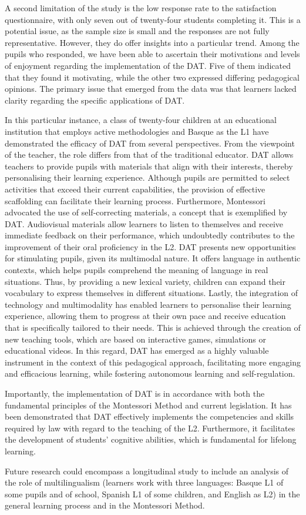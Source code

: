 A second limitation of the study is the low response rate to the satisfaction questionnaire, with only seven out of twenty-four students completing it. This is a potential issue, as the sample size is small and the responses are not fully representative. However, they do offer insights into a particular trend. Among the pupils who responded, we have been able to ascertain their motivations and levels of enjoyment regarding the implementation of the DAT. Five of them indicated that they found it motivating, while the other two expressed differing pedagogical opinions. The primary issue that emerged from the data was that learners lacked clarity regarding the specific applications of DAT.

In this particular instance, a class of twenty-four children at an educational institution that employs active methodologies and Basque as the L1 have demonstrated the efficacy of DAT from several perspectives. From the viewpoint of the teacher, the role differs from that of the traditional educator. DAT allows teachers to provide pupils with materials that align with their interests, thereby personalising their learning experience. Although pupils are permitted to select activities that exceed their current capabilities, the provision of effective scaffolding can facilitate their learning process. Furthermore, Montessori advocated the use of self-correcting materials, a concept that is exemplified by DAT. Audiovisual materials allow learners to listen to themselves and receive immediate feedback on their performance, which undoubtedly contributes to the improvement of their oral proficiency in the L2. DAT presents new opportunities for stimulating pupils, given its multimodal nature. It offers language in authentic contexts, which helps pupils comprehend the meaning of language in real situations. Thus, by providing a new lexical variety, children can expand their vocabulary to express themselves in different situations. Lastly, the integration of technology and multimodality has enabled learners to personalise their learning experience, allowing them to progress at their own pace and receive education that is specifically tailored to their needs. This is achieved through the creation of new teaching tools, which are based on interactive games, simulations or educational videos. In this regard, DAT has emerged as a highly valuable instrument in the context of this pedagogical approach, facilitating more engaging and efficacious learning, while fostering autonomous learning and self-regulation. 

Importantly, the implementation of DAT is in accordance with both the fundamental principles of the Montessori Method and current legislation. It has been demonstrated that DAT effectively implements the competencies and skills required by law with regard to the teaching of the L2. Furthermore, it facilitates the development of students' cognitive abilities, which is fundamental for lifelong learning.

Future research could encompass a longitudinal study to include an analysis of the role of multilingualism (learners work with three languages: Basque L1 of some pupils and of school, Spanish L1 of some children, and English as L2) in the general learning process and in the Montessori Method.